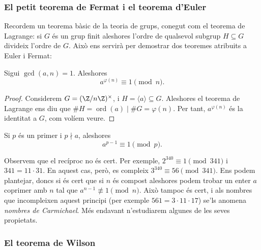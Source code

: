  \subsubsection{El petit teorema de Fermat i el teorema d'Euler}
 Recordem un teorema bàsic de la teoria de grups, conegut com el teorema de Lagrange: si $G$ és un grup finit aleshores l'ordre de qualsevol subgrup $H\subseteq G$ divideix l'ordre de $G$. Això ens servirà per demostrar dos teoremes atribuits a Euler i Fermat:
 \begin{theorem}[Euler]
 \label{thm:Euler}
 Sigui $\gcd(a,n)=1$. Aleshores
 \[
 a^{\varphi(n)}\equiv 1\pmod{n}.
 \]
 \end{theorem}
 \begin{proof}
  Considerem $G=(\Z/n\Z)^\times$, i $H=\langle a\rangle\subseteq G$. Aleshores el teorema de Lagrange ens diu que $\#H = \operatorname{ord}(a) \mid \#G = \varphi(n)$. Per tant, $a^{\varphi(n)}$ és la identitat a $G$, com volíem veure.
 \end{proof}
 
 \begin{corollary}
 Si $p$ és un primer i $p\nmid a$, aleshores
 \[
 a^{p-1} \equiv 1\pmod{p}.
 \]
 \end{corollary}
 
 \begin{remark}
 Observem que el recíproc no és cert. Per exemple, $2^{340}\equiv 1 \pmod{341}$ i $341=11\cdot 31$. En aquest cas, però, es compleix $3^{340}\equiv 56 \pmod{341}$. Ens podem plantejar, doncs si és cert que si $n$ és compost aleshores podem trobar un enter $a$ coprimer amb $n$ tal que $a^{n-1}\not\equiv 1 \pmod{n}$. Això tampoc és cert, i als nombres que incompleixen aquest principi (per exemple $561=3\cdot 11 \cdot 17$) se'ls anomena \emph{nombres de Carmichael}. Més endavant n'estudiarem algunes de les seves propietats.
 \end{remark}
 \subsubsection{El teorema de Wilson}
 
